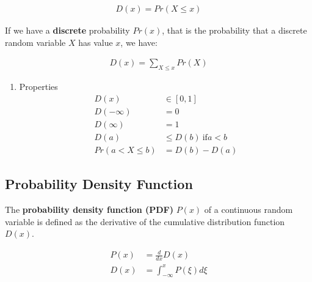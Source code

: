 \documentclass[11pt]{article}
\begin{document}
 \begin{align*}
     D\left( x \right) = Pr\left(X \leq x\right)
\end{align*}

If we have a \textbf{discrete} probability \(Pr\left( x \right)\), that is the probability that a discrete random variable \(X\) has value \(x\), we have:

\begin{align*}
    D\left( x \right) = \sum_{X \leq x} Pr\left( X \right)
\end{align*}

\begin{enumerate}
\item Properties
\label{sec:org5141915}
\begin{align*}
    D\left( x \right) &\in \left[0,1\right] \\
    D\left( -\infty \right) &= 0 \\
    D\left( \infty \right) &= 1 \\
    D\left( a \right) &\leq D\left( b \right)\ \text{if} a < b \\
    Pr\left( a < X \leq b \right) &= D\left( b \right) - D\left( a \right)
\end{align*}
\end{enumerate}

\subsection{Probability Density Function}
\label{sec:orge32ba73}
The \textbf{probability density function (PDF)} \(P\left( x \right)\) of a continuous random variable is defined as the derivative of the cumulative distribution function \(D\left( x \right)\).

\begin{align*}
    P\left( x \right) &= \frac{d}{dx}D\left( x \right) \\
    D\left( x \right) &= \int_{-\infty}^{x} P\left( \xi \right) d\xi
\end{align*}
\end{document}
